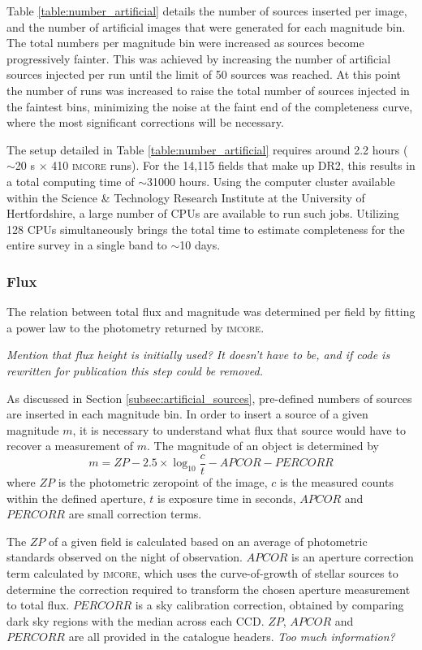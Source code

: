 \documentclass[a4paper,useAMS,usenatbib]{mn2e}
\begin{document}
Table \ref{table:number_artificial} details the number of sources inserted per image, and the number of artificial images that were generated for each magnitude bin. The total numbers per magnitude bin were increased as sources become progressively fainter. This was achieved by increasing the number of artificial sources injected per run until the limit of 50 sources was reached. At this point the number of runs was increased to raise the total number of sources injected in the faintest bins, minimizing the noise at the faint end of the completeness curve, where the most significant corrections will be necessary. 

The setup detailed in Table \ref{table:number_artificial} requires around 2.2 hours ($\sim$20 s $\times$ 410 \textsc{imcore} runs). For the 14,115 fields that make up DR2, this results in a total computing time of $\sim$31000 hours. Using the computer cluster  available within the Science \& Technology Research Institute at the University of Hertfordshire, a large number of CPUs are available to run such jobs. Utilizing 128 CPUs simultaneously brings the total time to estimate completeness for the entire survey in a single band to $\sim$10 days.

\subsubsection{Flux}
\label{subsubsec:flux}
The relation between total flux and magnitude was determined per field by fitting a power law to the photometry returned by \textsc{imcore}.

\textit{Mention that flux height is initially used? It doesn't have to be, and if code is rewritten for publication this step could be removed.}

As discussed in Section \ref{subsec:artificial_sources}, pre-defined numbers of sources are inserted in each magnitude bin. In order to insert a source of a given magnitude $m$, it is necessary to understand what flux that source would have to recover a measurement of $m$. The magnitude of an object is determined by
\begin{equation}
m = ZP - 2.5 \times \log_{10} {\dfrac{c}{t}} - APCOR - PERCORR
\label{eq:aperture_photometry}
\end{equation}
\noindent where $ZP$ is the photometric zeropoint of the image, $c$ is the measured counts within the defined aperture, $t$ is exposure time in seconds, $APCOR$ and $PERCORR$ are small correction terms. 

The $ZP$ of a given field is calculated based on an average of photometric standards observed on the night of observation. $APCOR$ is an aperture correction term calculated by \textsc{imcore}, which uses the curve-of-growth of stellar sources to determine the correction required to transform the chosen aperture measurement to total flux. $PERCORR$ is a sky calibration correction, obtained by comparing dark sky regions with the median across each CCD. $ZP$, $APCOR$ and $PERCORR$ are all provided in the catalogue headers. \textsl{Too much information?}
\end{document}
